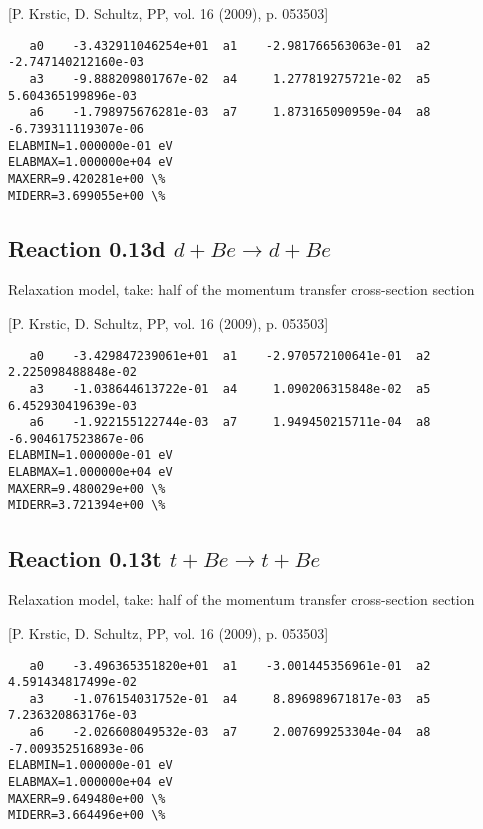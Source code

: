 \documentclass[12pt,dvipdfmx]{article}
\begin{document}
[P. Krstic, D. Schultz, PP, vol. 16 (2009), p. 053503]

\begin{small}\begin{verbatim}
   a0    -3.432911046254e+01  a1    -2.981766563063e-01  a2    -2.747140212160e-03
   a3    -9.888209801767e-02  a4     1.277819275721e-02  a5     5.604365199896e-03
   a6    -1.798975676281e-03  a7     1.873165090959e-04  a8    -6.739311119307e-06
ELABMIN=1.000000e-01 eV
ELABMAX=1.000000e+04 eV
MAXERR=9.420281e+00 \%
MIDERR=3.699055e+00 \%
\end{verbatim}\end{small}

\subsection{
Reaction 0.13d   $ d + Be \rightarrow d + Be $
}

Relaxation model, take: half of the momentum transfer cross-section
section

[P. Krstic, D. Schultz, PP, vol. 16 (2009), p. 053503]

\begin{small}\begin{verbatim}
   a0    -3.429847239061e+01  a1    -2.970572100641e-01  a2     2.225098488848e-02
   a3    -1.038644613722e-01  a4     1.090206315848e-02  a5     6.452930419639e-03
   a6    -1.922155122744e-03  a7     1.949450215711e-04  a8    -6.904617523867e-06
ELABMIN=1.000000e-01 eV
ELABMAX=1.000000e+04 eV
MAXERR=9.480029e+00 \%
MIDERR=3.721394e+00 \%
\end{verbatim}\end{small}

\subsection{
Reaction 0.13t   $ t + Be \rightarrow t + Be $
}

Relaxation model, take: half of the momentum transfer cross-section
section

[P. Krstic, D. Schultz, PP, vol. 16 (2009), p. 053503]

\begin{small}\begin{verbatim}
   a0    -3.496365351820e+01  a1    -3.001445356961e-01  a2     4.591434817499e-02
   a3    -1.076154031752e-01  a4     8.896989671817e-03  a5     7.236320863176e-03
   a6    -2.026608049532e-03  a7     2.007699253304e-04  a8    -7.009352516893e-06
ELABMIN=1.000000e-01 eV
ELABMAX=1.000000e+04 eV
MAXERR=9.649480e+00 \%
MIDERR=3.664496e+00 \%
\end{verbatim}\end{small}
\end{document}
